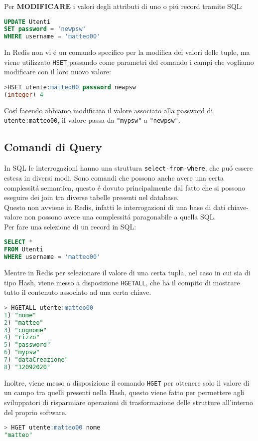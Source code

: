Per \textbf{MODIFICARE} i valori degli attributi di uno o piú record tramite SQL:
\begin{lstlisting}[autogobble, style=redis-cli, language=SQL]
UPDATE Utenti
SET password = 'newpsw'
WHERE username = 'matteo00'\end{lstlisting}

In Redis non vi é un comando specifico per la modifica dei valori delle tuple, ma viene utilizzato \texttt{HSET} passando come parametri del comando
i campi che vogliamo modificare con il loro nuovo valore:
\begin{lstlisting}[autogobble, style=redis-cli, language=SQL]
>HSET utente:matteo00 password newpsw
(integer) 4\end{lstlisting}
Cosí facendo abbiamo modificato il valore associato alla password di \texttt{utente:matteo00}, il valore passa da \texttt{"mypsw"} a \texttt{"newpsw"}.

\subsection{Comandi di Query}
In SQL le interrogazioni hanno una struttura \texttt{select-from-where}, che puó essere estesa in diversi modi. Sono comandi
che possono anche avere una certa complessitá semantica, questo é dovuto principalmente dal fatto che si possono eseguire dei join
tra diverse tabelle presenti nel database.\\
Questo non avviene in Redis, infatti le interrogazioni di una base di dati chiave-valore non possono avere una complessitá paragonabile a quella SQL.\\

Per fare una selezione di un record in SQL:
\begin{lstlisting}[autogobble,style=redis-cli, language=SQL]
SELECT *
FROM Utenti
WHERE username = 'matteo00'\end{lstlisting}

Mentre in Redis per selezionare il valore di una certa tupla, nel caso in cui sia di tipo Hash, viene messo a disposizione \texttt{HGETALL}, che ha il compito di mostrare tutto
il contenuto associato ad una certa chiave.
\begin{lstlisting}[autogobble, style=redis-cli, language=SQL]
> HGETALL utente:matteo00
1) "nome"
2) "matteo"
3) "cognome"
4) "rizzo"
5) "password"
6) "mypsw"
7) "dataCreazione"
8) "12092020"
\end{lstlisting}

Inoltre, viene messo a disposizione il comando \texttt{HGET} per ottenere solo il valore di un campo tra quelli presenti nella Hash, questo viene fatto per permettere
agli sviluppatori di risparmiare operazioni di trasformazione delle strutture all'interno del proprio software.
\begin{lstlisting}[autogobble, style=redis-cli, language=SQL]
> HGET utente:matteo00 nome
"matteo"
\end{lstlisting}

